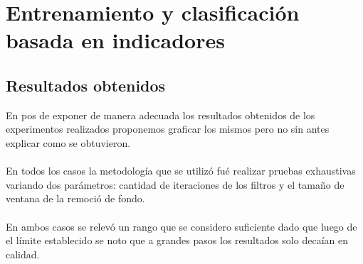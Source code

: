 \section{Entrenamiento y clasificaci\'on basada en indicadores}


\subsection{Resultados obtenidos}

En pos de exponer de manera adecuada los resultados obtenidos de los experimentos realizados proponemos graficar los mismos pero no sin antes explicar como se obtuvieron.
\paragraph{}
En todos los casos la metodolog\'ia que se utiliz\'o fu\'e realizar pruebas exhaustivas variando dos par\'ametros: cantidad de iteraciones de los filtros y el tamaño de ventana de la remoci\'o de fondo.
\paragraph{}
En ambos casos se relev\'o un rango que se considero suficiente dado que luego de el límite establecido se noto que a grandes pasos los resultados solo deca\'ian en calidad.

